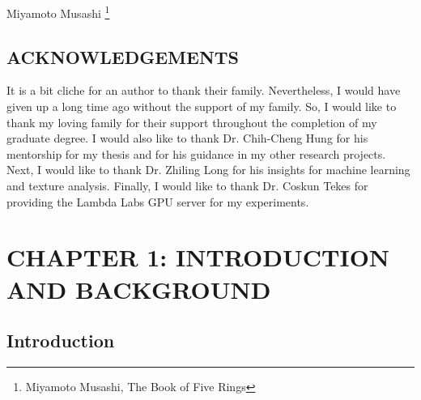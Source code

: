 \documentclass[12pt]{article}
\newcommand{\toppage}{\vspace*{0.3in}}
\begin{document}
\vspace{0.5in}
\hspace*{\fill} Miyamoto Musashi \footnote{Miyamoto Musashi, The Book of Five
    Rings}
\newpage

\toppage
\begin{center}
    \section{ACKNOWLEDGEMENTS}
\end{center}
\vspace{0.5in}

\noindent It is a bit cliche for an author to thank their family. Nevertheless,
I would have given up a long time ago without the support of my family. So, I
would like to thank my loving family for their support throughout the completion
of my graduate degree. I would also like to thank Dr. Chih-Cheng Hung for his
mentorship for my thesis and for his guidance in my other research projects.
Next, I would like to thank Dr. Zhiling Long for his insights for machine
learning and texture analysis. Finally, I would like to thank Dr. Coskun Tekes
for providing the Lambda Labs GPU server for my experiments.
\newpage

\begin{center}
    \tableofcontents
\end{center}
\newpage

\begin{center}
    \listoffigures
\end{center}
\newpage

\begin{center}
    \listoftables
\end{center}
\newpage

\setlength{\parskip}{\baselineskip}

\section{CHAPTER 1: INTRODUCTION AND BACKGROUND}
\subsection{Introduction}
\end{document}
